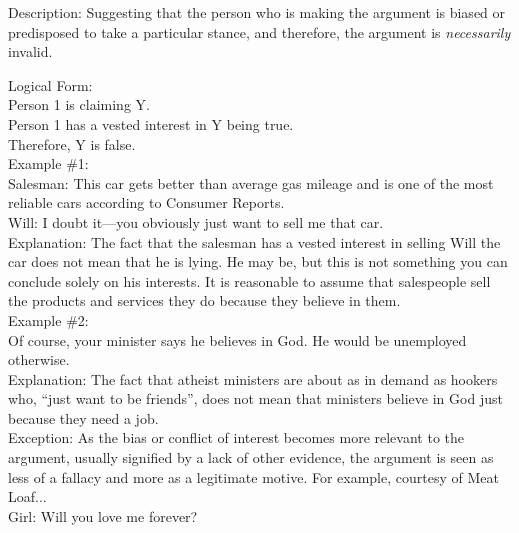 \documentclass[a4paper,12pt,single,pdftex]{scrartcl}
\begin{document}
  
    Description: Suggesting that the person who is making the argument is biased or predisposed to take a particular stance, and therefore, the argument is {\it necessarily} invalid.

    
      Logical Form:
    \\

    
      Person 1 is claiming Y.
    \\

    
      Person 1 has a vested interest in Y being true.
    \\

    
      Therefore, Y is false.
    \\

    
      Example \#1:
    \\

    
      Salesman: This car gets better than average gas mileage and is one of the most reliable cars according to Consumer Reports.
    \\

    
      Will: I doubt it—you obviously just want to sell me that car.
    \\

    
      Explanation: The fact that the salesman has a vested interest in selling Will the car does not mean that he is lying.  He may be, but this is not something you can conclude solely on his interests.  It is reasonable to assume that salespeople sell the products and services they do because they believe in them.
    \\

    
      Example \#2:
    \\

    
      Of course, your minister says he believes in God.  He would be unemployed otherwise.
    \\

    
      Explanation: The fact that atheist ministers are about as in demand as hookers who, “just want to be friends”, does not mean that ministers believe in God just because they need a job.
    \\

    
      Exception: As the bias or conflict of interest becomes more relevant to the argument, usually signified by a lack of other evidence, the argument is seen as less of a fallacy and more as a legitimate motive.  For example, courtesy of Meat Loaf...
    \\

    
      Girl: Will you love me forever?
    \\
\end{document}
